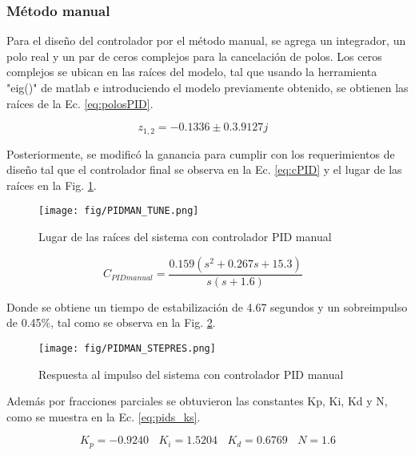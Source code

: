 \documentclass[conference,onecolumn,12pt]{IEEEtran}
\numberwithin{equation}{subsection}
\begin{document}
\subsubsection{Método manual}

Para el diseño del controlador por el método manual, se agrega un integrador, un polo real y un par de ceros complejos para la cancelación de polos. Los ceros complejos se ubican en las raíces del modelo, tal que usando la herramienta "eig()" de matlab e introduciendo el modelo previamente obtenido, se obtienen las raíces de la Ec. \ref{eq:polosPID}.

\begin{equation}
    z_{1,2} = -0.1336 \pm 0.3.9127j \ \ \ \ 
    \label{eq:polosPID}
\end{equation}

Posteriormente, se modificó la ganancia para cumplir con los requerimientos de diseño tal que el controlador final se observa en la Ec. \ref{eq:cPID} y el lugar de las raíces en la Fig. \ref{fig:pamhsys_pidroot}.

\begin{figure}[htbp]
    \centering
    \texttt{[image: fig/PIDMAN\_TUNE.png]}
    \caption{Lugar de las raíces del sistema con controlador PID manual}
    \label{fig:pamhsys_pidroot}
\end{figure}

\begin{equation}
    C_{PIDmanual} = \frac{0.159(s^2+0.267s+15.3)}{s(s+1.6)} \ \ \ \ 
    \label{eq:cPID}
\end{equation}

Donde se obtiene un tiempo de estabilización de 4.67 segundos y un sobreimpulso de 0.45\%, tal como se observa en la Fig. \ref{fig:pamhsys_pistep}.

\begin{figure}[!ht]
    \centering
    \texttt{[image: fig/PIDMAN\_STEPRES.png]}
    \caption{Respuesta al impulso del sistema con controlador PID manual}
    \label{fig:pamhsys_pistep}
\end{figure}

Además por fracciones parciales se obtuvieron las constantes Kp, Ki, Kd y N, como se muestra en la Ec. \ref{eq:pids_ks}.

\begin{equation}
    K_p = -0.9240\ \ \ \ K_i = 1.5204 \ \ \ \ K_d = 0.6769\ \ \ \ N = 1.6
    \label{eq:pids_ks}
\end{equation}
\end{document}
